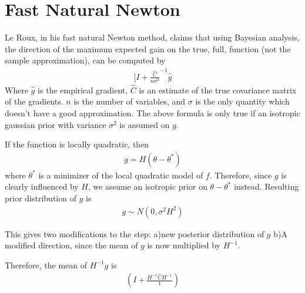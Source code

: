 \documentclass{article}
\begin{document}
\section*{Fast Natural Newton}

Le Roux, in his fast natural Newton method, claims that using Bayesian analysis, the direction of the maximum expected gain on the true, full, function (not the sample approximation), can be computed by 
\begin{align*}
[ I + \frac{\hat{C}}{n \sigma^2}^{-1} \hat{g}
\end{align*}
Where $\hat{g}$ is the empirical gradient, $\hat{C}$ is an estimate of the true covariance matrix of the gradients. $n$ is the number of variables, and $\sigma$ is the only quantity which doesn't have a good approximation. The above formula is only true if an isotropic gaussian prior with variance $\sigma^2$ is assumed on $g$.

If the function is locally quadratic, then 
\begin{align*}
g = H(\theta - \theta^*)
\end{align*} 
where $\theta^*$ is a minimizer of the local quadratic model of $f$. Therefore, since $g$ is clearly influenced by $H$, we assume an isotropic prior on $\theta - \theta^*$ instead. Resulting prior distribution of $g$ is 
\begin{align*}
g \sim N(0, \sigma^2 H^2)
\end{align*}

This gives two modifications to the step: 
a)new posterior distribution of $g$
b)A modified direction, since the mean of $g$ is now multiplied by $H^{-1}$.

Therefore, the mean of $H^{-1} g$ is
\begin{align*}
(I + \frac{H^{-1} \hat{C} H^{-1}}{1})
\end{align*}
\end{document}
